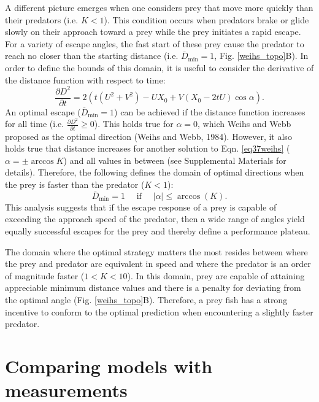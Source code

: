 \documentclass[12pt]{article}
\def\d{\partial}
\newcommand{\ol}{\overline}
\begin{document}
A different picture emerges when one considers prey that move more quickly than their predators (i.e. $K<1$). This condition occurs when predators brake or glide slowly on their approach toward a prey \citep{Higham:2007go, Higham:2005iu} while the prey initiates a rapid escape. 
For a variety of escape angles, the fast start of these prey cause the predator to reach no closer than the starting distance (i.e. $\ol D_{\text{min}}=1$, Fig. \ref{weihs_topo}B). In order to define the bounds of this domain, it is useful to consider the derivative of the distance function with respect to time:
%
\begin{equation}
\frac{\d D^2}{\d t}= 2(t(U^2+V^2) - UX_0 + V(X_0-2tU)\cos\alpha).
\label{distderivative}
\end{equation}  
%
An optimal escape ($\ol D_{\text{min}}=1$) can be achieved if the distance function increases for all time (i.e. $\frac{\d D^2}{\d t}\geq0$). This holds true for $\alpha=0$, which Weihs and Webb proposed as the optimal direction (Weihs and Webb, 1984). 
However, it also holds true that distance increases for another solution to Eqn. \ref{eq37weihs} ($\alpha= \pm \arccos K$) and all values in between (see Supplemental Materials for details). Therefore, the following defines the domain of optimal directions when the prey is faster than the predator ($K<1$):
%
\begin{equation}
\ol D_{\text{min}}=1 \quad \text{ if } \quad  | \alpha |  \leq \arccos(K).
\label{anglerange}
\end{equation}
%
This analysis suggests that if the escape response of a prey is capable of exceeding the approach speed of the predator, then a wide range of angles yield equally successful escapes for the prey and thereby define a performance plateau. 

The domain where the optimal strategy matters the most resides between where the prey and predator are equivalent in speed and where the predator is an order of magnitude faster ($1<K<10$). 
In this domain, prey are capable of attaining appreciable minimum distance values and there is a penalty for deviating from the optimal angle (Fig. \ref{weihs_topo}B). 
Therefore, a prey fish has a strong incentive to conform to the optimal prediction when encountering a slightly faster predator.

\section{Comparing models with measurements}
\end{document}

